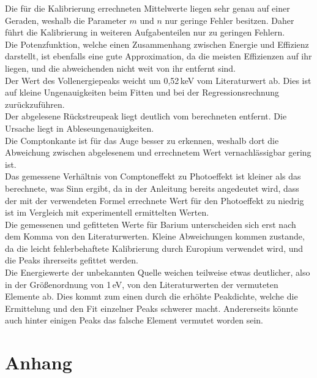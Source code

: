   Die für die Kalibrierung errechneten Mittelwerte liegen sehr genau auf einer
  Geraden, weshalb die Parameter $m$ und $n$ nur geringe Fehler besitzen.
  Daher führt die Kalibrierung in weiteren Aufgabenteilen nur zu geringen
  Fehlern. \\
  Die Potenzfunktion, welche einen Zusammenhang zwischen Energie und Effizienz
  darstellt, ist ebenfalls eine gute Approximation, da die meisten
  Effizienzen auf ihr liegen, und die abweichenden nicht weit von ihr entfernt sind.\\
  Der Wert des Vollenergiepeaks weicht um 0,52\,keV vom Literaturwert ab.
  \cite{nuklide}
  Dies ist auf kleine Ungenauigkeiten beim Fitten und bei der Regressionsrechnung
  zurückzuführen.\\
  Der abgelesene Rückstreupeak liegt deutlich vom berechneten entfernt.
  Die Ursache liegt in Ableseungenauigkeiten.\\
  Die Comptonkante ist für das Auge besser zu erkennen, weshalb
  dort die Abweichung zwischen abgelesenem und errechnetem Wert
  vernachlässigbar gering ist.\\
  Das gemessene Verhältnis von Comptoneffekt zu Photoeffekt ist kleiner
  als das berechnete, was Sinn ergibt, da in der Anleitung bereits angedeutet
  wird, dass der mit der verwendeten Formel errechnete Wert für den Photoeffekt zu niedrig ist im Vergleich
  mit experimentell ermittelten Werten.\\
  Die gemessenen und gefitteten Werte für Barium unterscheiden sich
  erst nach dem Komma von den Literaturwerten. Kleine Abweichungen
  kommen zustande, da die leicht fehlerbehaftete Kalibrierung durch Europium
  verwendet wird, und die Peaks ihrerseits gefittet werden.\\
  Die Energiewerte der unbekannten Quelle weichen teilweise etwas deutlicher,
  also in der Größenordnung von 1\,eV,
  von den Literaturwerten der vermuteten Elemente ab.
  Dies kommt zum einen durch die erhöhte Peakdichte, welche die Ermittelung und
  den Fit einzelner Peaks schwerer macht. Andererseits könnte auch hinter
  einigen Peaks das falsche Element vermutet worden sein.


\section{Anhang}


